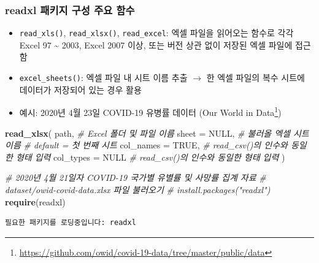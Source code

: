 \documentclass[
  11pt,
]{krantz}
\newenvironment{Shaded}{\begin{snugshade}}{\end{snugshade}}
\newcommand{\CommentTok}[1]{\textcolor[rgb]{0.37,0.37,0.37}{\textit{#1}}}
\newcommand{\DataTypeTok}[1]{\textcolor[rgb]{0.27,0.27,0.27}{#1}}
\newcommand{\KeywordTok}[1]{\textcolor[rgb]{0.27,0.27,0.27}{\textbf{#1}}}
\newcommand{\NormalTok}[1]{#1}
\newcommand{\OtherTok}[1]{\textcolor[rgb]{0.37,0.37,0.37}{#1}}
\providecommand{\tightlist}{%
  \setlength{\itemsep}{0pt}\setlength{\parskip}{0pt}}
\renewcommand{\href}[2]{#2\footnote{\url{#1}}}
\begin{document}
\hypertarget{readxl-funs}{%
\subsubsection*{\texorpdfstring{\textbf{readxl} 패키지 구성 주요 함수}{readxl 패키지 구성 주요 함수}}\label{readxl-funs}}


\begin{itemize}
\tightlist
\item
  \texttt{read\_xls()}, \texttt{read\_xlsx()}, \texttt{read\_excel}: 엑셀 파일을 읽어오는 함수로 각각 Excel 97 \textasciitilde{} 2003, Excel 2007 이상, 또는 버전 상관 없이 저장된 엑셀 파일에 접근함
\item
  \texttt{excel\_sheets()}: 엑셀 파일 내 시트 이름 추출 \(\rightarrow\) 한 엑셀 파일의 복수 시트에 데이터가 저장되어 있는 경우 활용
\item
  예시: 2020년 4월 23일 COVID-19 유병률 데이터 (\href{https://github.com/owid/covid-19-data/tree/master/public/data}{Our World in Data})
\end{itemize}

\footnotesize

\begin{Shaded}
\begin{Highlighting}[]
\KeywordTok{read_xlsx}\NormalTok{(}
\NormalTok{  path, }\CommentTok{# Excel 폴더 및 파일 이름}
  \DataTypeTok{sheet =} \OtherTok{NULL}\NormalTok{, }\CommentTok{# 불러올 엑셀 시트 이름}
                \CommentTok{# default = 첫 번째 시트}
  \DataTypeTok{col_names =} \OtherTok{TRUE}\NormalTok{, }\CommentTok{# read_csv()의 인수와 동일한 형태 입력}
  \DataTypeTok{col_types =} \OtherTok{NULL}  \CommentTok{# read_csv()의 인수와 동일한 형태 입력}
\NormalTok{)}
\end{Highlighting}
\end{Shaded}

\normalsize

\footnotesize

\begin{Shaded}
\begin{Highlighting}[]
\CommentTok{# 2020년 4월 21일자 COVID-19 국가별 유별률 및 사망률 집계 자료}
\CommentTok{# dataset/owid-covid-data.xlsx 파일 불러오기 }
\CommentTok{# install.packages("readxl")}
\KeywordTok{require}\NormalTok{(readxl)}
\end{Highlighting}
\end{Shaded}

\begin{verbatim}
필요한 패키지를 로딩중입니다: readxl
\end{verbatim}
\end{document}
